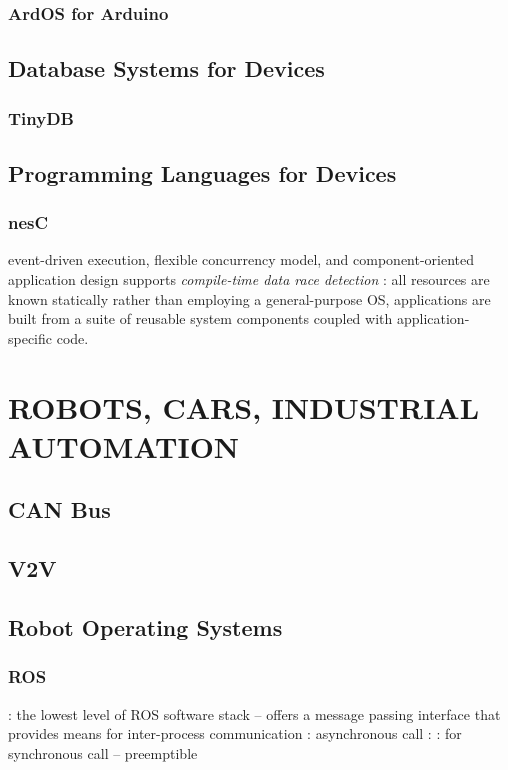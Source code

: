 \documentclass{myproc}
\begin{document}
\subsubsection{ArdOS for Arduino}

\subsection{Database Systems for Devices}
\subsubsection{TinyDB}

\subsection{Programming Languages for Devices}
\subsubsection{nesC}
\bit
\w event-driven execution, flexible concurrency model, and component-oriented
application design 
\w supports {\em compile-time data race detection\/}
\w {}:  
  \ben
  \w all resources are known statically
  \w rather than employing a general-purpose OS, applications are built from a
  suite of reusable system components coupled with application-specific code.
  \een
\eit

\section{ROBOTS, CARS, INDUSTRIAL AUTOMATION}
\subsection{CAN Bus}
\bit
\w 
\eit

\subsection{V2V}
\bit
\w 
\eit

\subsection{Robot Operating Systems}
\subsubsection{ROS}
\bit
\w {}: the lowest level of ROS software stack -- offers a
message passing interface that provides means for inter-process communication 
   \bit
   \w {}: asynchronous call
   \w {}:
   \w {}: for synchronous call -- \textcolor{red2}{preemptible}
    
\end{document}
